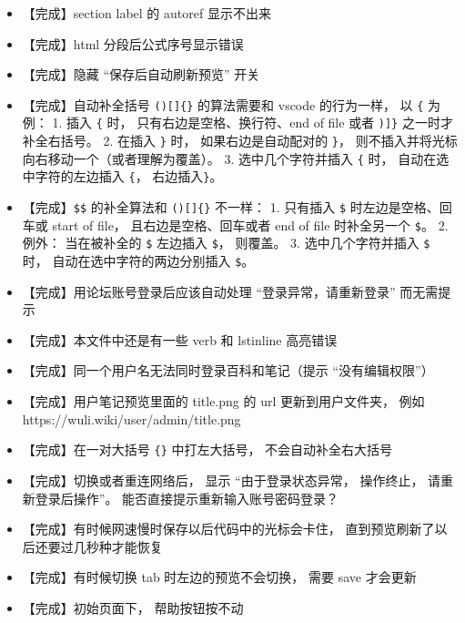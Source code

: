 \begin{itemize}
\item 【完成】section label 的 autoref 显示不出来

\item 【完成】html 分段后公式序号显示错误

\item 【完成】隐藏 “保存后自动刷新预览” 开关

\item 【完成】自动补全括号 \verb|()[]{}| 的算法需要和 vscode 的行为一样， 以 \verb|{| 为例： 1. 插入 \verb|{| 时， 只有右边是空格、换行符、end of file 或者 \verb|)]}| 之一时才补全右括号。 2.  在插入 \verb|}| 时， 如果右边是自动配对的 \verb|}|， 则不插入并将光标向右移动一个（或者理解为覆盖）。 3. 选中几个字符并插入 \verb|{| 时， 自动在选中字符的左边插入 \verb|{|， 右边插入\verb|}|。

\item 【完成】\verb|$$| 的补全算法和 \verb|()[]{}| 不一样： 1. 只有插入 \verb|$| 时左边是空格、回车或 start of file， 且右边是空格、回车或者 end of file 时补全另一个 \verb|$|。 2. 例外： 当在被补全的 \verb|$| 左边插入 \verb|$|， 则覆盖。 3. 选中几个字符并插入 \verb|$| 时， 自动在选中字符的两边分别插入 \verb|$|。

\item 【完成】用论坛账号登录后应该自动处理 “登录异常，请重新登录” 而无需提示

\item 【完成】本文件中还是有一些 verb 和 lstinline 高亮错误

\item 【完成】同一个用户名无法同时登录百科和笔记（提示 “没有编辑权限”）

\item 【完成】用户笔记预览里面的 title.png 的 url 更新到用户文件夹， 例如 https://wuli.wiki/user/admin/title.png

\item 【完成】在一对大括号 \verb|{}| 中打左大括号， 不会自动补全右大括号

\item 【完成】切换或者重连网络后， 显示 “由于登录状态异常， 操作终止， 请重新登录后操作”。 能否直接提示重新输入账号密码登录？

\item 【完成】有时候网速慢时保存以后代码中的光标会卡住， 直到预览刷新了以后还要过几秒种才能恢复

\item 【完成】有时候切换 tab 时左边的预览不会切换， 需要 save 才会更新

\item 【完成】初始页面下， 帮助按钮按不动


\end{itemize}
